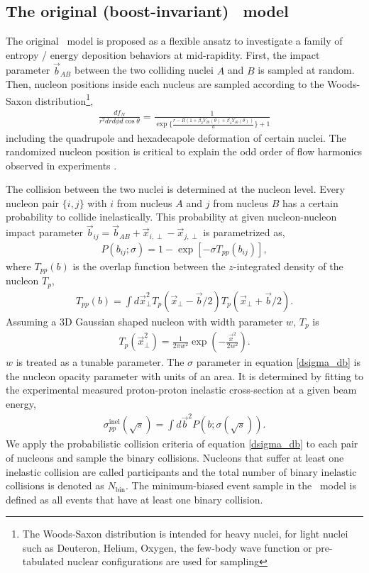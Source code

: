 \subsection{The original (boost-invariant) \trento\ model}
The original \trento\ model is proposed as a flexible ansatz to investigate a family of entropy / energy deposition behaviors at mid-rapidity.
First, the impact parameter $\vec{b}_{AB}$ between the two colliding nuclei $A$ and $B$ is sampled at random.
Then, nucleon positions inside each nucleus are sampled according to the Woods-Saxon distribution\footnote{The Woods-Saxon distribution is intended for heavy nuclei, for light nuclei such as Deuteron, Helium, Oxygen, the few-body wave function or pre-tabulated nuclear configurations are used for sampling},
\begin{eqnarray}
\frac{df_N}{r^2 dr d\phi d\cos\theta} = \frac{1}{\exp\{\frac{r-R(1+\beta_2 Y_{20}(\theta)+\beta_4 Y_{40}(\theta))}{a}\}+1}
\end{eqnarray}
including the quadrupole and hexadecapole deformation of certain nuclei.
The randomized nucleon position is critical to explain the odd order of flow harmonics observed in experiments \cite{Alver:2010gr}.

The collision between the two nuclei is determined at the nucleon level. 
Every nucleon pair $\{i, j\}$ with $i$ from nucleus $A$ and $j$ from nucleus $B$ has a certain probability to collide inelastically.
This probability at given nucleon-nucleon impact parameter $\vec{b}_{ij} = \vec{b}_{AB} + \vec{x}_{i, \perp} -  \vec{x}_{j, \perp}$ is parametrized as,
\begin{eqnarray}
P(b_{ij}; \sigma) = 1 - \exp\left[-\sigma T_{pp}(b_{ij})\right],
\label{dsigma_db}
\end{eqnarray}
where $T_{pp}(b)$ is the overlap function between the $z$-integrated density of the nucleon $T_p$,
\begin{eqnarray}
T_{pp}(b) = \int d\vec{x}_\perp^2 T_p(\vec{x}_\perp-\vec{b}/2) T_p(\vec{x}_\perp+\vec{b}/2).
\end{eqnarray}
Assuming a 3D Gaussian shaped nucleon with width parameter $w$, $T_p$ is
\begin{eqnarray}
T_p(\vec{x}_\perp^2) = \frac{1}{2\pi w^2} \exp\left(-\frac{\vec{x}^2}{2w^2}\right).
\end{eqnarray}
$w$ is treated as a tunable parameter.
The $\sigma$ parameter in equation \ref{dsigma_db} is the nucleon opacity parameter with units of an area.
It is determined by fitting to the experimental measured proton-proton inelastic cross-section at a given beam energy,
\begin{eqnarray}
\sigma_{pp}^\text{inel}(\sqrt{s}) = \int d\vec{b}^2 P(b; \sigma(\sqrt{s})).
\end{eqnarray}
We apply the probabilistic collision criteria of equation \ref{dsigma_db} to each pair of nucleons and sample the binary collisions. 
Nucleons that suffer at least one inelastic collision are called participants and the total number of binary inelastic collisions is denoted as $N_{\textrm{bin}}$.
The minimum-biased event sample in the \trento\ model is defined as all events that have at least one binary collision.

